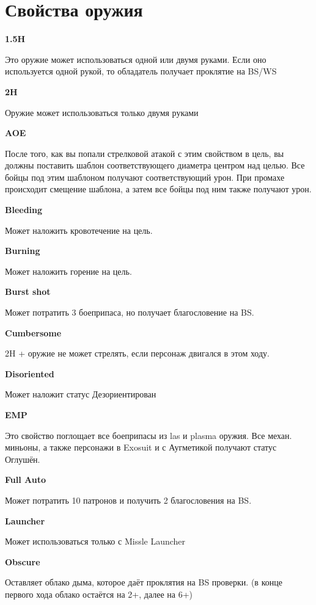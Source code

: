 \section*{Свойства оружия}
    \begin{multicols}{2}
        \textbf{1.5H}

        Это оружие может использоваться одной или двумя руками. Если оно используется одной рукой, то обладатель получает проклятие на BS/WS

        \textbf{2H}

        Оружие может использоваться только двумя руками

        \textbf{AOE}

        После того, как вы попали стрелковой атакой с этим свойством в цель, вы должны поставить шаблон соответствующего диаметра центром над целью.
        Все бойцы под этим шаблоном получают соответствующий урон. При промахе происходит смещение шаблона, а затем все бойцы под ним также получают урон. 

        \textbf{Bleeding}

        Может наложить кровотечение на цель.

        \textbf{Burning}

        Может наложить горение на цель.

        \textbf{Burst shot}

        Может потратить 3 боеприпаса, но получает благословение на BS.

        \textbf{Cumbersome}

        2H + оружие не может стрелять, если персонаж двигался в этом ходу.

        \textbf{Disoriented}

        Может наложит статус Дезориентирован

        \textbf{EMP}

        Это свойство поглощает все боеприпасы из las и plasma оружия. Все механ. миньоны, а также персонажи в Exosuit и с Аугметикой получают статус Оглушён.

        \textbf{Full Auto}

        Может потратить 10 патронов и получить 2 благословения на BS.

        \textbf{Launcher}

        Может использоваться только с Missle Launcher

        \textbf{Obscure}

        Оставляет облако дыма, которое даёт проклятия на BS проверки. (в конце первого хода облако остаётся на 2+, далее на 6+)


\end{multicols}
